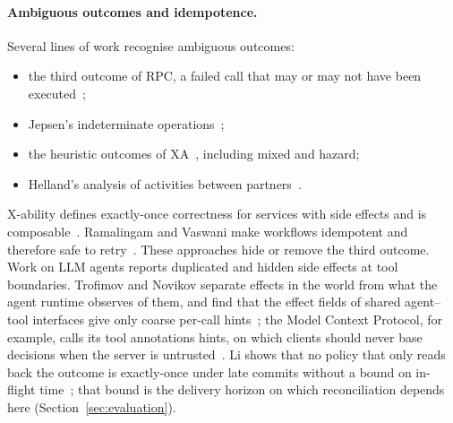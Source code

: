 \documentclass[11pt]{article}
\theoremstyle{definition}
\theoremstyle{plain}
\begin{document}
\paragraph{Ambiguous outcomes and idempotence.} Several lines of work recognise ambiguous outcomes:
\begin{itemize}[nosep]
  \item the third outcome of RPC, a failed call that may or may not have been executed~\citep{BirrellNelson1984};
  \item Jepsen's indeterminate operations~\citep{Jepsen,KingsburyAlvaro2020Elle};
  \item the heuristic outcomes of XA~\citep{XA1991}, including mixed and hazard;
  \item Helland's analysis of activities between partners~\citep{Helland2007,HellandCampbell2009}.
\end{itemize}
X-ability defines exactly-once correctness for services with side effects and is composable~\citep{FrolundGuerraoui2001XAbility}. Ramalingam and Vaswani make workflows idempotent and therefore safe to retry~\citep{RamalingamVaswani2013}. These approaches hide or remove the third outcome. Work on LLM agents reports duplicated and hidden side effects at tool boundaries. Trofimov and Novikov separate effects in the world from what the agent runtime observes of them, and find that the effect fields of shared agent--tool interfaces give only coarse per-call hints~\citep{TrofimovNovikov2026}; the Model Context Protocol, for example, calls its tool annotations hints, on which clients should never base decisions when the server is untrusted~\citep{MCPTools}. Li shows that no policy that only reads back the outcome is exactly-once under late commits without a bound on in-flight time~\citep{Li2026ExactlyOnce}; that bound is the delivery horizon on which reconciliation depends here (Section~\ref{sec:evaluation}).
\end{document}
